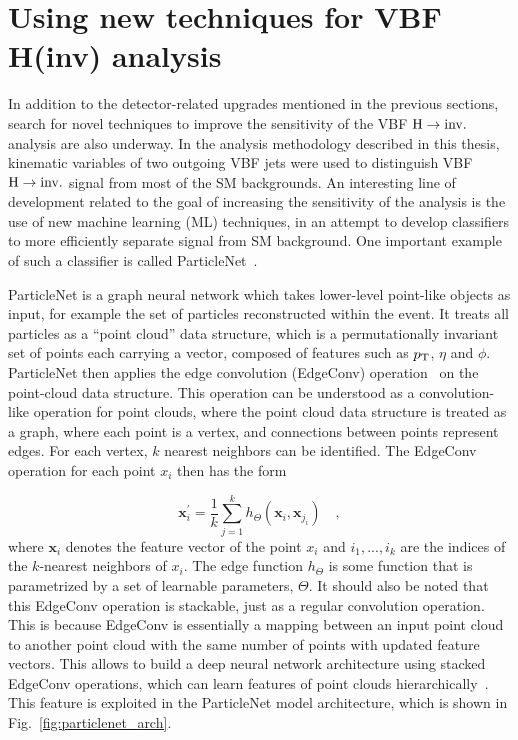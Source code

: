 \section{Using new techniques for VBF H(inv) analysis}

\graphicspath{{5_Outlook/Figures}}

In addition to the detector-related upgrades mentioned in the previous sections, search for novel techniques
to improve the sensitivity of the VBF $\textrm{H} \rightarrow \textrm{inv.}$ analysis are also underway. In the analysis methodology described
in this thesis, kinematic variables of two outgoing VBF jets were used to distinguish VBF $\textrm{H} \rightarrow \textrm{inv.}$ signal from
most of the SM backgrounds. An interesting line of development related to the goal of increasing the sensitivity 
of the analysis is the use of new machine learning (ML) techniques, in an attempt to develop classifiers to
more efficiently separate signal from SM background. One important example of such a classifier is called
ParticleNet~\cite{CMS:ParticleNetPaper}. 

ParticleNet is a graph neural network which takes lower-level point-like
objects as input, for example the set of particles reconstructed within the event. It treats all particles
as a ``point cloud'' data structure, which is a permutationally invariant set of points each carrying a
vector, composed of features such as $p_{\textrm{T}}$, $\eta$ and $\phi$. ParticleNet then applies the edge convolution
(EdgeConv) operation~\cite{Wang:DynamicGraphCNNPaper} on the point-cloud data structure. This operation can be
understood as a convolution-like operation for point clouds, where the point cloud data structure is treated as
a graph, where each point is a vertex, and connections between points represent edges. For each vertex, $k$
nearest neighbors can be identified. The EdgeConv operation for each point $x_{i}$ then has the form

\begin{equation}
    \mathbf{x}_i^{'} = \frac{1}{k} \sum_{j=1}^{k} h_{\Theta}(\mathbf{x}_i, \mathbf{x}_{j_i}) \quad ,
\end{equation}
where $\mathbf{x}_i$ denotes the feature vector of the point $x_i$ and ${i_1,...,i_k}$ are the indices of the 
$k$-nearest neighbors of $x_i$. The edge function $h_{\Theta}$ is some function that is parametrized by
a set of learnable parameters, $\Theta$. It should also be noted that this EdgeConv operation is stackable,
just as a regular convolution operation. This is because EdgeConv is essentially a mapping between an input
point cloud to another point cloud with the same number of points with updated feature vectors. 
This allows to build a deep neural network architecture 
using stacked EdgeConv operations, which can learn features of point clouds 
hierarchically~\cite{CMS:ParticleNetPaper}. 
This feature is exploited in the ParticleNet model architecture, which is shown in Fig.~\ref{fig:particlenet_arch}.

